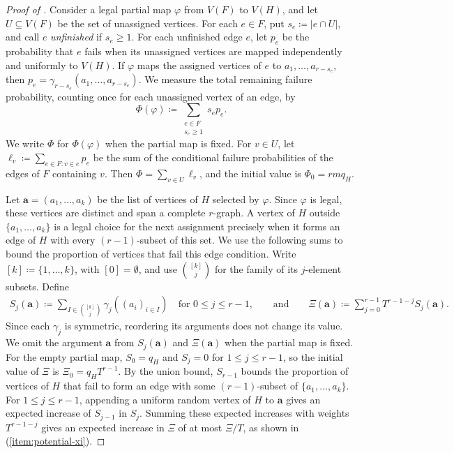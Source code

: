 \documentclass[10pt]{article}
\numberwithin{equation}{section}
\begin{document}
\begin{proof}[Proof of ]
Consider a legal partial map $\varphi$ from $V(F)$ to $V(H)$, and let $U\subseteq V(F)$ be the set of unassigned vertices. For each $e\in F$, put $s_e\coloneqq|e\cap U|$, and call $e$ \emph{unfinished} if $s_e\ge1$. For each unfinished edge $e$, let $p_e$ be the probability that $e$ fails when its unassigned vertices are mapped independently and uniformly to $V(H)$. If $\varphi$ maps the assigned vertices of $e$ to $a_1,\ldots,a_{r-s_e}$, then $p_e=\gamma_{r-s_e}(a_1,\ldots,a_{r-s_e})$. We measure the total remaining failure probability, counting once for each unassigned vertex of an edge, by
\[
\Phi(\varphi)\coloneqq\sum_{\substack{e\in F\\s_e\ge1}}s_ep_e.
\]
We write $\Phi$ for $\Phi(\varphi)$ when the partial map is fixed. For $v\in U$, let $\ell_v\coloneqq\sum_{e\in F\colon v\in e}p_e$ be the sum of the conditional failure probabilities of the edges of $F$ containing $v$. Then $\Phi=\sum_{v\in U}\ell_v$, and the initial value is $\Phi_0=rmq_H$.

Let $\mathbf a=(a_1,\ldots,a_k)$ be the list of vertices of $H$ selected by $\varphi$. Since $\varphi$ is legal, these vertices are distinct and span a complete $r$-graph. A vertex of $H$ outside $\{a_1,\ldots,a_k\}$ is a legal choice for the next assignment precisely when it forms an edge of $H$ with every $(r-1)$-subset of this set. We use the following sums to bound the proportion of vertices that fail this edge condition. Write $[k]\coloneqq\{1,\ldots,k\}$, with $[0]=\emptyset$, and use $\binom{[k]}j$ for the family of its $j$-element subsets. Define
\[
\begin{aligned}
S_j(\mathbf a)\coloneqq
\sum_{I\in\binom{[k]}j}\gamma_j((a_i)_{i\in I})
\quad\text{for }0\le j\le r-1,\qquad\text{and}\qquad \Xi(\mathbf a)\coloneqq
\sum_{j=0}^{r-1}T^{r-1-j}S_j(\mathbf a).
\end{aligned}
\]
Since each $\gamma_j$ is symmetric, reordering its arguments does not change its value. We omit the argument $\mathbf a$ from $S_j(\mathbf a)$ and $\Xi(\mathbf a)$ when the partial map is fixed. For the empty partial map, $S_0=q_H$ and $S_j=0$ for $1\le j\le r-1$, so the initial value of $\Xi$ is $\Xi_0=q_HT^{r-1}$. By the union bound, $S_{r-1}$ bounds the proportion of vertices of $H$ that fail to form an edge with some $(r-1)$-subset of $\{a_1,\ldots,a_k\}$. For $1\le j\le r-1$, appending a uniform random vertex of $H$ to $\mathbf a$ gives an expected increase of $S_{j-1}$ in $S_j$. Summing these expected increases with weights $T^{r-1-j}$ gives an expected increase in $\Xi$ of at most $\Xi/T$, as shown in (\ref{item:potential-xi}).


\end{proof}
\end{document}
